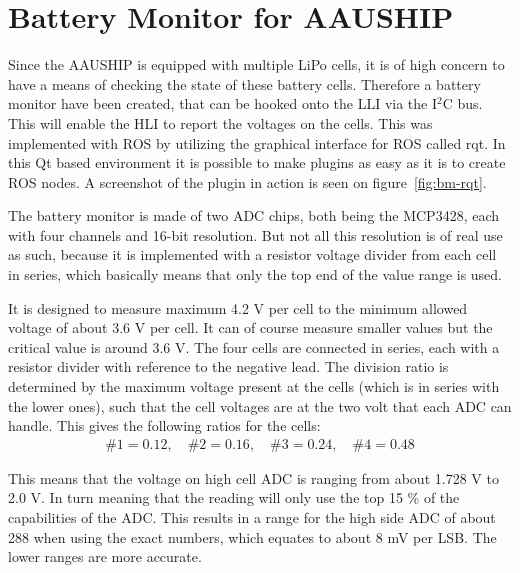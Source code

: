 \chapter{Battery Monitor for AAUSHIP}
\label{ch:bm}


Since the AAUSHIP is equipped with multiple LiPo cells, it is of high concern to have a means of checking the state of these battery cells.
Therefore a battery monitor have been created, that can be hooked onto the
\ac{LLI} via the I$^2$C bus. This will enable the \ac{HLI} to report
the voltages on the cells. This was implemented with \ac{ROS} by
utilizing the graphical interface for \ac{ROS} called rqt. In this Qt
based environment it is possible to make plugins as easy as it is to
create \ac{ROS} nodes. A screenshot of the plugin in action is seen
on figure~\vref{fig:bm-rqt}.

The battery monitor is made of two \ac{ADC} chips, both being the MCP3428,
each with four channels and 16-bit resolution. But not all this
resolution is of real use as such, because it is implemented with a
resistor voltage divider from each cell in series, which basically
means that only the top end of the value range is used. 

It is designed to measure maximum 4.2 V per cell to the minimum
allowed voltage of about 3.6 V per cell. It can of course measure
smaller values but the critical value is around 3.6 V. The four cells are connected in series, each with a resistor divider with
reference to the negative lead. The division ratio is determined by
the maximum voltage present at the cells (which is in series with the
lower ones), such that the cell voltages are at the two volt that
each \ac{ADC} can handle. This gives the following ratios for the
cells:
\begin{align}
	\#1 = 0.12, \quad \#2 = 0.16, \quad \#3 = 0.24, \quad \#4 = 0.48
\end{align}

This means that the voltage on high cell \ac{ADC} is ranging from
about 1.728 V to 2.0 V. In turn meaning that the reading will only use
the top 15 \% of the capabilities of the \ac{ADC}. This results in a
range for the high side \ac{ADC} of about 288 when using the exact
numbers, which equates to about 8 mV per \ac{LSB}. The lower ranges
are more accurate.

